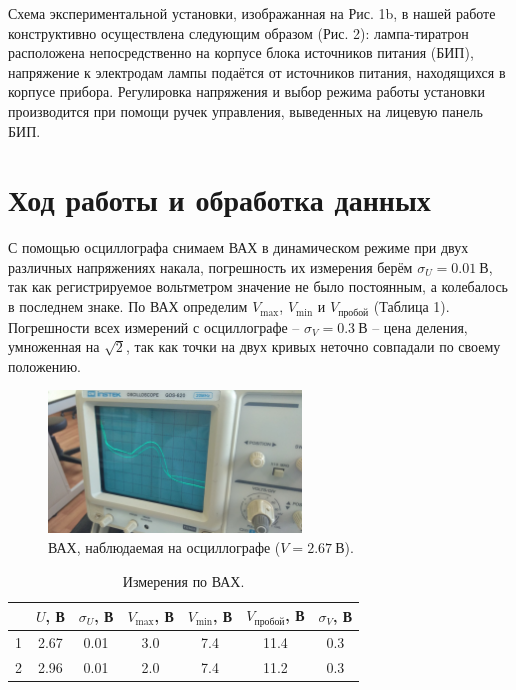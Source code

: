\documentclass[a4paper,12pt]{article}
\begin{document}
Схема экспериментальной установки, изображанная на Рис. 1b, в нашей работе конструктивно осуществлена следующим образом (Рис. 2): лампа-тиратрон расположена непосредственно на корпусе блока источников питания (БИП), напряжение к электродам лампы подаётся от источников питания, находящихся в корпусе прибора. Регулировка напряжения и выбор режима работы установки производится при помощи ручек управления, выведенных на лицевую панель БИП.
\section*{Ход работы и обработка данных}
С помощью осциллографа снимаем ВАХ в динамическом режиме при двух различных напряжениях накала, погрешность их измерения берём $\sigma_U = 0.01~\text{В}$, так как регистрируемое вольтметром значение не было постоянным, а колебалось в последнем знаке. По ВАХ определим $V_{\text{max}}$, $V_{\text{min}}$ и $V_{\text{пробой}}$ (Таблица 1). Погрешности всех измерений с осциллографе -- $\sigma_V = 0.3~\text{В}$ -- цена деления, умноженная на $\sqrt{2}$, так как точки на двух кривых неточно совпадали по своему положению.
\begin{figure}[h]
\includegraphics[width=0.6\textwidth]{4.jpg}
\centering
\caption{ВАХ, наблюдаемая на осциллографе ($V = 2.67~\text{В}$).}
\end{figure}
\begin{table}[h]
\begin{tabular}{|c|c|c|c|c|c|c|}
\hline
  & $U$, В & $\sigma_U$, В & $V_{\text{max}}$, В & $V_{\text{min}}$, В & $V_{\text{пробой}}$, В & $\sigma_V$, В \\ \hline
1 & 2.67   & 0.01          & 3.0                   & 7.4                 & 11.4                   & 0.3           \\ \hline
2 & 2.96   & 0.01          & 2.0                   & 7.4                 & 11.2                   & 0.3           \\ \hline
\end{tabular}
\centering
\caption{Измерения по ВАХ.}
\end{table}\\
\end{document}
